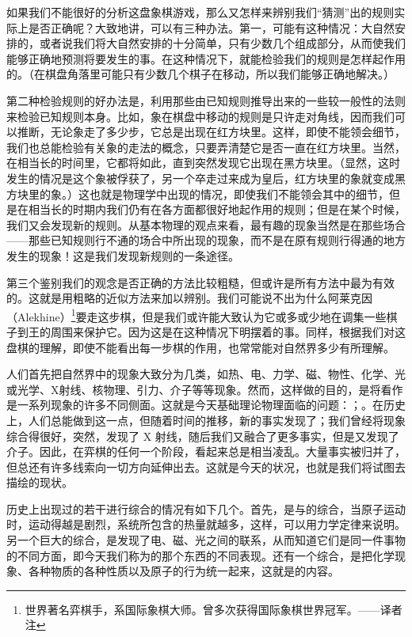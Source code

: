 如果我们不能很好的分析这盘象棋游戏，那么又怎样来辨别我们“猜测”出的规则实际上是否正确呢？大致地讲，可以有三种办法。第一，可能有这种情况：大自然安排的，或者说我们将大自然安排的十分简单，只有少数几个组成部分，从而使我们能够正确地预测将要发生的事。在这种情况下，就能检验我们的规则是怎样起作用的。（在棋盘角落里可能只有少数几个棋子在移动，所以我们能够正确地解决。）

第二种检验规则的好办法是，利用那些由已知规则推导出来的一些较一般性的法则来检验已知规则本身。比如，象在棋盘中移动的规则是只许走对角线，因而我们可以推断，无论象走了多少步，它总是出现在红方块里。这样，即使不能领会细节，我们也总能检验有关象的走法的概念，只要弄清楚它是否一直在红方块里。当然，在相当长的时间里，它都将如此，直到突然发现它出现在黑方块里。（显然，这时发生的情况是这个象被俘获了，另一个卒走过来成为皇后，红方块里的象就变成黑方块里的象。）这也就是物理学中出现的情况，即使我们不能领会其中的细节，但是在相当长的时期内我们仍有在各方面都很好地起作用的规则；但是在某个时候，我们又会发现新的规则。从基本物理的观点来看，最有趣的现象当然是在那些场合——那些已知规则行不通的场合中所出现的现象，而不是在原有规则行得通的地方发生的现象！这是我们发现新规则的一条途径。

第三个鉴别我们的观念是否正确的方法比较粗糙，但或许是所有方法中最为有效的。这就是用粗略的近似方法来加以辨别。我们可能说不出为什么阿莱克因（Alekhine）\footnote{世界著名弈棋手，系国际象棋大师。曾多次获得国际象棋世界冠军。——译者注}要走这步棋，但是我们或许能大致认为它或多或少地在调集一些棋子到王的周围来保护它。因为这是在这种情况下明摆着的事。同样，根据我们对这盘棋的理解，即使不能看出每一步棋的作用，也常常能对自然界多少有所理解。

人们首先把自然界中的现象大致分为几类，如热、电、力学、磁、物性、化学、光或光学、X射线、核物理、引力、介子等等现象。然而，这样做的目的，是将看作是一系列现象的许多不同侧面。这就是今天基础理论物理面临的问题：；。在历史上，人们总能做到这一点，但随着时间的推移，新的事实发现了；我们曾经将现象综合得很好，突然，发现了 X 射线，随后我们又融合了更多事实，但是又发现了介子。因此，在弈棋的任何一个阶段，看起来总是相当凌乱。大量事实被归并了，但总还有许多线索向一切方向延伸出去。这就是今天的状况，也就是我们将试图去描绘的现状。

历史上出现过的若干进行综合的情况有如下几个。首先，是与的综合，当原子运动时，运动得越是剧烈，系统所包含的热量就越多，这样，可以用力学定律来说明。另一个巨大的综合，是发现了电、磁、光之间的联系，从而知道它们是同一件事物的不同方面，即今天我们称为的那个东西的不同表现。还有一个综合，是把化学现象、各种物质的各种性质以及原子的行为统一起来，这就是的内容。

